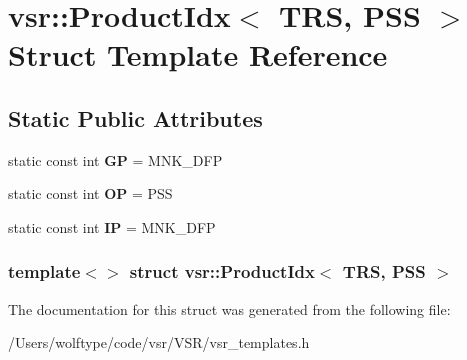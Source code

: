 \hypertarget{structvsr_1_1_product_idx_3_01_t_r_s_00_01_p_s_s_01_4}{\section{vsr\-:\-:Product\-Idx$<$ T\-R\-S, P\-S\-S $>$ Struct Template Reference}
\label{structvsr_1_1_product_idx_3_01_t_r_s_00_01_p_s_s_01_4}
}
\subsection*{Static Public Attributes}
\begin{DoxyCompactItemize}
\item 
\hypertarget{structvsr_1_1_product_idx_3_01_t_r_s_00_01_p_s_s_01_4_ad7edce566155e6967caadd8f9feda76a}{static const int {\bfseries G\-P} = M\-N\-K\-\_\-\-D\-F\-P}\label{structvsr_1_1_product_idx_3_01_t_r_s_00_01_p_s_s_01_4_ad7edce566155e6967caadd8f9feda76a}

\item 
\hypertarget{structvsr_1_1_product_idx_3_01_t_r_s_00_01_p_s_s_01_4_a56ba7a10355ec8e94ba039a0cdacaf8c}{static const int {\bfseries O\-P} = P\-S\-S}\label{structvsr_1_1_product_idx_3_01_t_r_s_00_01_p_s_s_01_4_a56ba7a10355ec8e94ba039a0cdacaf8c}

\item 
\hypertarget{structvsr_1_1_product_idx_3_01_t_r_s_00_01_p_s_s_01_4_ad55006c6d71839a5f6e47d84588a1dbb}{static const int {\bfseries I\-P} = M\-N\-K\-\_\-\-D\-F\-P}\label{structvsr_1_1_product_idx_3_01_t_r_s_00_01_p_s_s_01_4_ad55006c6d71839a5f6e47d84588a1dbb}

\end{DoxyCompactItemize}
\subsubsection*{template$<$$>$ struct vsr\-::\-Product\-Idx$<$ T\-R\-S, P\-S\-S $>$}



The documentation for this struct was generated from the following file\-:\begin{DoxyCompactItemize}
\item 
/\-Users/wolftype/code/vsr/\-V\-S\-R/vsr\-\_\-templates.\-h\end{DoxyCompactItemize}
